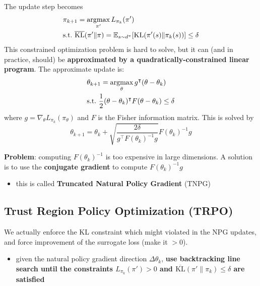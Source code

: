 \documentclass[../course-notes.tex]{subfiles}
\begin{document}
The update step becomes
\begin{equation}
\begin{aligned}
	&\pi_{k+1} = \operatorname*{\mathrm{argmax}}_{\pi'} L_{\pi_k}(\pi')  \\
	& \mathrm{s.t.} \ \overline{\mathrm{KL}}(\pi'\|\pi) = \operatorname{\mathbb{E}}_{s\sim d^\pi}[\mathrm{KL}(\pi'(s)\|\pi_k(s))] \leq \delta
\end{aligned}
\end{equation}
This constrained optimization problem is hard to solve, but it can (and in practice, should) be \textbf{approximated by a quadratically-constrained linear program}. The approximate update is:
\[
\begin{aligned}
	&\theta_{k+1} = \operatorname*{\mathrm{argmax}}_\theta g^\intercal (\theta - \theta_k)  \\
	& \mathrm{s.t.}\  \frac{1}{2}(\theta-\theta_k)^\intercal F (\theta - \theta_k) \leq \delta
\end{aligned}
\]
where $g = \nabla_\theta L_{\pi_k}(\pi_\theta)$ and $F$ is the Fisher information matrix. This is solved by
\begin{equation}\label{eq:NPGupdate}
	\theta_{k+1} = \theta_k + \sqrt{\frac{2\delta}{g^\intercal F(\theta_k)^{-1}g}} F(\theta_k)^{-1}g
\end{equation}


\textbf{\redfont Problem}: computing $F(\theta_k)^{-1}$ is too expensive in large dimensions. A solution is to use the \textbf{conjugate gradient} to compute $F(\theta_k)^{-1}g$
\begin{itemize}
	\item[\textrightarrow] this is called \textbf{\bluefont Truncated Natural Policy Gradient} (TNPG)
\end{itemize}


\subsection{Trust Region Policy Optimization (TRPO)}

We actually enforce the KL constraint which might violated in the NPG updates, and force improvement of the surrogate loss (make it $>0$).
\begin{itemize}
	\item[\textrightarrow] given the natural policy gradient direction $\Delta\theta_k$, \textbf{\boldmath use backtracking line search until the constraints $L_{\pi_k}(\pi') > 0$ and $\overline{\mathrm{KL}}(\pi'\|\pi_k) \leq \delta$ are satisfied}
\end{itemize}
\end{document}
